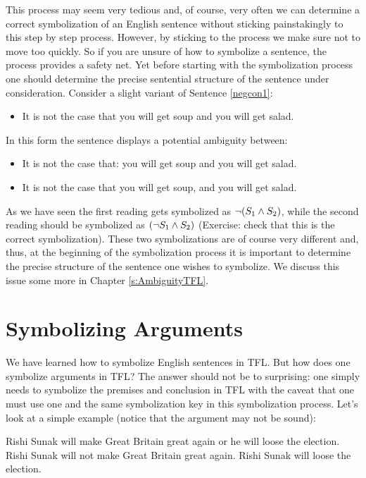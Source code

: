 This process may seem very tedious and, of course, very often we can determine a correct symbolization of an English sentence without sticking painstakingly to this step by step process. However, by sticking to the process we make sure not to move too quickly. So if you are unsure of how to symbolize a sentence, the process provides a safety net. Yet before starting with the symbolization process one should determine the precise sentential structure of the sentence under consideration. Consider a slight variant of Sentence \ref{negcon1}:
\begin{itemize}
\item It is not the case that you will get soup and you will get salad.
\end{itemize}
In this form the sentence displays a potential ambiguity between:
\begin{itemize}
\item It is not the case that: you will get soup and you will get salad.
\item It is not the case that you will get soup, and you will get salad.
\end{itemize}
As we have seen the first reading gets symbolized as $\neg(S_1\mathbin{\wedge} S_2)$, while the second reading should be symbolized as $(\neg S_1\mathbin{\wedge} S_2)$ (Exercise: check that this is the correct symbolization). These two symbolizations are of course very different and, thus, at the beginning of the symbolization process it is important to determine the precise structure of the sentence one wishes to symbolize. We discuss this issue some more in Chapter \ref{s:AmbiguityTFL}.

\section{Symbolizing Arguments}
We have learned how to symbolize English sentences in TFL. But how does one symbolize arguments in TFL? The answer should not be to surprising: one simply needs to symbolize the premises and conclusion in TFL with the caveat that one must use one and the same symbolization key in this symbolization process. Let's look at a simple example (notice that the argument may not be sound):

\begin{earg}
\prem Rishi Sunak will make Great Britain great again or he will loose the election.
\prem Rishi Sunak will not make Great Britain great again.
\conc Rishi Sunak will loose the election.
\end{earg}

